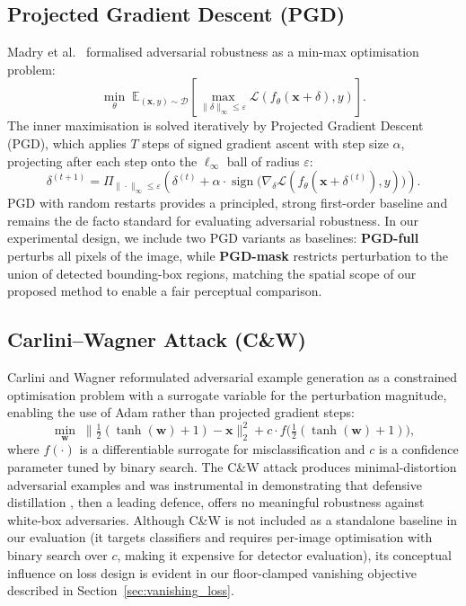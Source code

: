 \documentclass[12pt,a4paper]{report}
\begin{document}
\subsection{Projected Gradient Descent (PGD)}
\label{subsec:pgd}

Madry et al.\ \cite{madry2018towards} formalised adversarial robustness as a
min-max optimisation problem:
%
\begin{equation}
  \min_\theta \; \mathbb{E}_{(\mathbf{x},y)\sim\mathcal{D}} \left[
    \max_{\|\delta\|_\infty \leq \varepsilon}
    \mathcal{L}(f_\theta(\mathbf{x}+\delta), y) \right].
  \label{eq:minmax}
\end{equation}
%
The inner maximisation is solved iteratively by Projected Gradient Descent
(PGD), which applies $T$ steps of signed gradient ascent with step size
$\alpha$, projecting after each step onto the $\ell_\infty$ ball of radius
$\varepsilon$:
%
\begin{equation}
  \delta^{(t+1)} = \Pi_{\|\cdot\|_\infty \leq \varepsilon}
    \left( \delta^{(t)} + \alpha \cdot \operatorname{sign}
    \bigl(\nabla_\delta \mathcal{L}(f_\theta(\mathbf{x}+\delta^{(t)}), y)\bigr)
    \right).
  \label{eq:pgd}
\end{equation}
%
PGD with random restarts provides a principled, strong first-order baseline
and remains the de facto standard for evaluating adversarial robustness.
In our experimental design, we include two PGD variants as baselines:
\textbf{PGD-full} perturbs all pixels of the image, while
\textbf{PGD-mask} restricts perturbation to the union of detected
bounding-box regions, matching the spatial scope of our proposed method to
enable a fair perceptual comparison.

\subsection{Carlini--Wagner Attack (C\&W)}

Carlini and Wagner \cite{carlini2017evaluating} reformulated adversarial example
generation as a constrained optimisation problem with a surrogate variable for
the perturbation magnitude, enabling the use of Adam \cite{kingma2015adam}
rather than projected gradient steps:
%
\begin{equation}
  \min_{\mathbf{w}} \; \|\tfrac{1}{2}(\tanh(\mathbf{w})+1) - \mathbf{x}\|_2^2
  + c \cdot f\bigl(\tfrac{1}{2}(\tanh(\mathbf{w})+1)\bigr),
\end{equation}
%
where $f(\cdot)$ is a differentiable surrogate for misclassification and $c$
is a confidence parameter tuned by binary search. The C\&W attack produces
minimal-distortion adversarial examples and was instrumental in demonstrating
that defensive distillation \cite{papernot2016distillation}, then a
leading defence, offers no meaningful robustness against white-box
adversaries. Although C\&W is not included as a standalone baseline in our
evaluation (it targets classifiers and requires per-image optimisation with
binary search over $c$, making it expensive for detector evaluation), its
conceptual influence on loss design is evident in our floor-clamped vanishing
objective described in Section~\ref{sec:vanishing_loss}.
\end{document}
